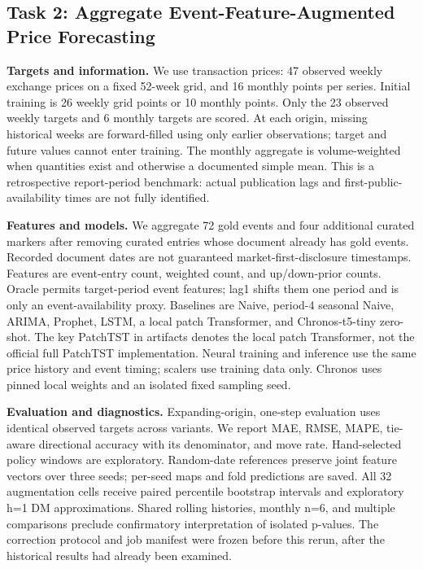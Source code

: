 \documentclass[sigconf,anonymous,review]{acmart}
\begin{document}
\subsection{Task 2: Aggregate Event-Feature-Augmented Price Forecasting}
\textbf{Targets and information.} We use transaction prices: 47 observed weekly exchange prices on a fixed 52-week grid, and 16 monthly points per series. Initial training is 26 weekly grid points or 10 monthly points. Only the 23 observed weekly targets and 6 monthly targets are scored. At each origin, missing historical weeks are forward-filled using only earlier observations; target and future values cannot enter training. The monthly aggregate is volume-weighted when quantities exist and otherwise a documented simple mean. This is a retrospective report-period benchmark: actual publication lags and first-public-availability times are not fully identified.

\textbf{Features and models.} We aggregate 72 gold events and four additional curated markers after removing curated entries whose document already has gold events. Recorded document dates are not guaranteed market-first-disclosure timestamps. Features are event-entry count, weighted count, and up/down-prior counts. Oracle permits target-period event features; lag1 shifts them one period and is only an event-availability proxy. Baselines are Naive, period-4 seasonal Naive, ARIMA, Prophet, LSTM, a local patch Transformer, and Chronos-t5-tiny zero-shot. The key PatchTST in artifacts denotes the local patch Transformer, not the official full PatchTST implementation. Neural training and inference use the same price history and event timing; scalers use training data only. Chronos uses pinned local weights and an isolated fixed sampling seed.

\textbf{Evaluation and diagnostics.} Expanding-origin, one-step evaluation uses identical observed targets across variants. We report MAE, RMSE, MAPE, tie-aware directional accuracy with its denominator, and move rate. Hand-selected policy windows are exploratory. Random-date references preserve joint feature vectors over three seeds; per-seed maps and fold predictions are saved. All 32 augmentation cells receive paired percentile bootstrap intervals and exploratory h=1 DM approximations. Shared rolling histories, monthly n=6, and multiple comparisons preclude confirmatory interpretation of isolated p-values. The correction protocol and job manifest were frozen before this rerun, after the historical results had already been examined.
\end{document}
